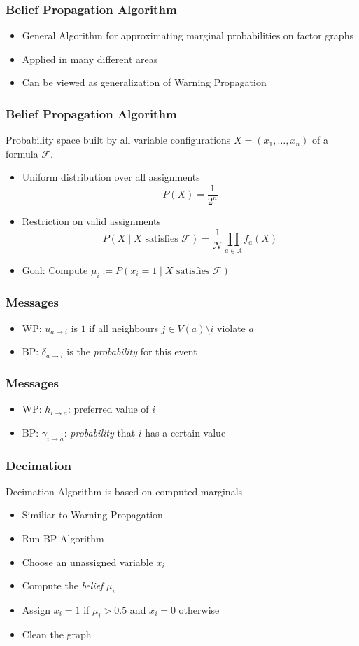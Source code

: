 \begin{frame}
	\frametitle{Belief Propagation Algorithm}
	\begin{itemize}
		\item General Algorithm for approximating marginal probabilities on factor graphs
		\item Applied in many different areas
		\item Can be viewed as generalization of Warning Propagation
	\end{itemize}
\end{frame}

\begin{frame}
	\frametitle{Belief Propagation Algorithm}
	Probability space built by all variable configurations $X = (x_1, \ldots, x_n)$ of a formula $\mathcal{F}$.
	\begin{itemize}
		\item Uniform distribution over all assignments 
		$$P(X) = \frac{1}{2^n}$$
		\item Restriction on valid assignments
	$$P(X \; | \; X \text{ satisfies } \mathcal{F}) = \frac{1}{\mathcal{N}} \prod_{a \in A} f_a(X)$$
	\item Goal: Compute $\mu_i := P(x_i = 1 \; | \; X \text{ satisfies } \mathcal{F})$
	\end{itemize}
\end{frame}

\begin{frame}
	\frametitle{Messages}
	
	\begin{itemize}
		\item WP: $u_{a \rightarrow i}$ is $1$ if all neighbours $j \in V(a) \setminus i$ violate $a$
		\item BP: $\delta_{a \rightarrow i}$ is the \emph{probability} for this event
	\end{itemize}
	
	
\end{frame}

\begin{frame}
	\frametitle{Messages}
	
	\begin{itemize}
		\item WP: $h_{i \rightarrow a}$: preferred value of $i$
		\item BP: $\gamma_{i \rightarrow a}$: \emph{probability} that $i$ has a certain value
	\end{itemize}
\end{frame}

\begin{frame}
	\frametitle{Decimation}
	Decimation Algorithm is based on computed marginals
	\begin{itemize}
		\item Similiar to Warning Propagation
		\item Run BP Algorithm
		\item Choose an unassigned variable $x_i$
		\item Compute the \emph{belief} $\mu_i$
		\item Assign $x_i = 1$ if $\mu_i > 0.5$ and $x_i = 0$ otherwise
		\item Clean the graph
	\end{itemize}
\end{frame}